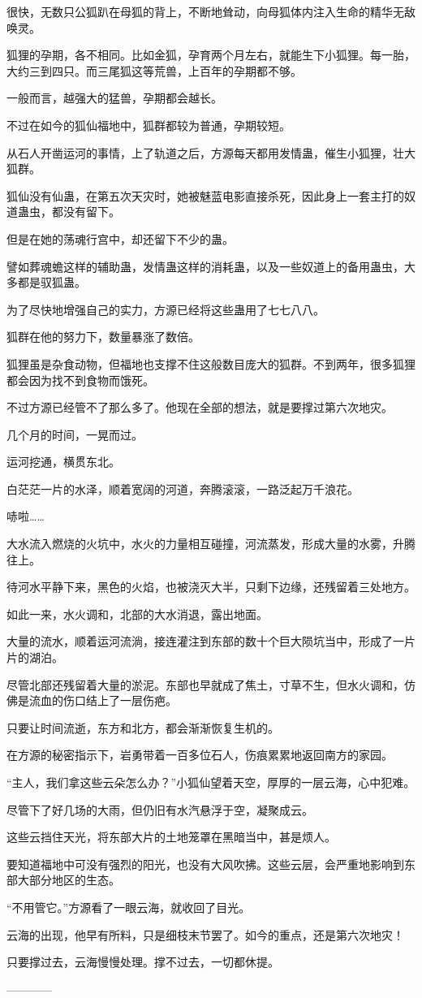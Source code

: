 \begin{this_body}
很快，无数只公狐趴在母狐的背上，不断地耸动，向母狐体内注入生命的精华无敌唤灵。

狐狸的孕期，各不相同。比如金狐，孕育两个月左右，就能生下小狐狸。每一胎，大约三到四只。而三尾狐这等荒兽，上百年的孕期都不够。

一般而言，越强大的猛兽，孕期都会越长。

不过在如今的狐仙福地中，狐群都较为普通，孕期较短。

从石人开凿运河的事情，上了轨道之后，方源每天都用发情蛊，催生小狐狸，壮大狐群。

狐仙没有仙蛊，在第五次天灾时，她被魅蓝电影直接杀死，因此身上一套主打的奴道蛊虫，都没有留下。

但是在她的荡魂行宫中，却还留下不少的蛊。

譬如葬魂蟾这样的辅助蛊，发情蛊这样的消耗蛊，以及一些奴道上的备用蛊虫，大多都是驭狐蛊。

为了尽快地增强自己的实力，方源已经将这些蛊用了七七八八。

狐群在他的努力下，数量暴涨了数倍。

狐狸虽是杂食动物，但福地也支撑不住这般数目庞大的狐群。不到两年，很多狐狸都会因为找不到食物而饿死。

不过方源已经管不了那么多了。他现在全部的想法，就是要撑过第六次地灾。

几个月的时间，一晃而过。

运河挖通，横贯东北。

白茫茫一片的水泽，顺着宽阔的河道，奔腾滚滚，一路泛起万千浪花。

哧啦……

大水流入燃烧的火坑中，水火的力量相互碰撞，河流蒸发，形成大量的水雾，升腾往上。

待河水平静下来，黑色的火焰，也被浇灭大半，只剩下边缘，还残留着三处地方。

如此一来，水火调和，北部的大水消退，露出地面。

大量的流水，顺着运河流淌，接连灌注到东部的数十个巨大陨坑当中，形成了一片片的湖泊。

尽管北部还残留着大量的淤泥。东部也早就成了焦土，寸草不生，但水火调和，仿佛是流血的伤口结上了一层伤疤。

只要让时间流逝，东方和北方，都会渐渐恢复生机的。

在方源的秘密指示下，岩勇带着一百多位石人，伤痕累累地返回南方的家园。

“主人，我们拿这些云朵怎么办？”小狐仙望着天空，厚厚的一层云海，心中犯难。

尽管下了好几场的大雨，但仍旧有水汽悬浮于空，凝聚成云。

这些云挡住天光，将东部大片的土地笼罩在黑暗当中，甚是烦人。

要知道福地中可没有强烈的阳光，也没有大风吹拂。这些云层，会严重地影响到东部大部分地区的生态。

“不用管它。”方源看了一眼云海，就收回了目光。

云海的出现，他早有所料，只是细枝末节罢了。如今的重点，还是第六次地灾！

只要撑过去，云海慢慢处理。撑不过去，一切都休提。

------------

\end{this_body}


